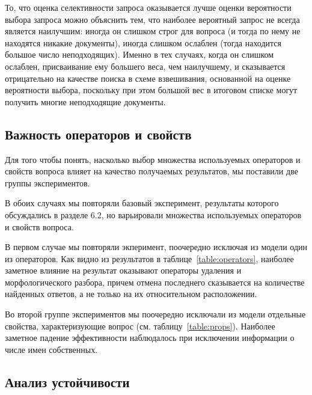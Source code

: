 \documentclass{article}
\begin{document}
То, что оценка селективности запроса оказывается лучше оценки 
вероятности выбора запроса %
%
%
можно объяснить тем, что наиболее вероятный запрос %
не всегда является наилучшим: иногда он слишком строг для вопроса
(и тогда по нему не находятся никакие документы),
иногда слишком ослаблен (тогда находится большое число неподходящих).
Именно в тех случаях, когда он слишком ослаблен, присваивание ему большего
веса, чем наилучшему, и сказывается отрицательно на качестве поиска
в схеме взвешивания, основанной на оценке вероятности выбора,
поскольку при этом большой вес в итоговом списке могут получить многие
неподходящие документы.


\subsection{Важность операторов и свойств}

Для того чтобы понять, насколько выбор множества используемых операторов 
и свойств вопроса влияет на качество получаемых результатов, мы поставили две
группы экспериментов.

В обоих случаях мы повторяли базовый эксперимент, 
результаты которого обсуждались в разделе 6.2, но 
варьировали множества используемых операторов и свойств вопроса.

В первом случае мы повторяли экперимент, поочередно исключая из модели один
из операторов. Как видно из результатов в таблице~\ref{table:operators},
наиболее заметное влияние на результат оказывают операторы удаления и морфологического
разбора, причем отмена последнего сказывается на количестве найденных
ответов, а не только на их относительном расположении.

Во второй группе экспериментов мы поочередно исключали из модели 
отдельные свойства, характеризующие вопрос (см. таблицу~\ref{table:props}). 
Наиболее заметное падение эффективности наблюдалось при исключении 
информации о числе имен собственных.


\subsection{Анализ устойчивости}
\end{document}
